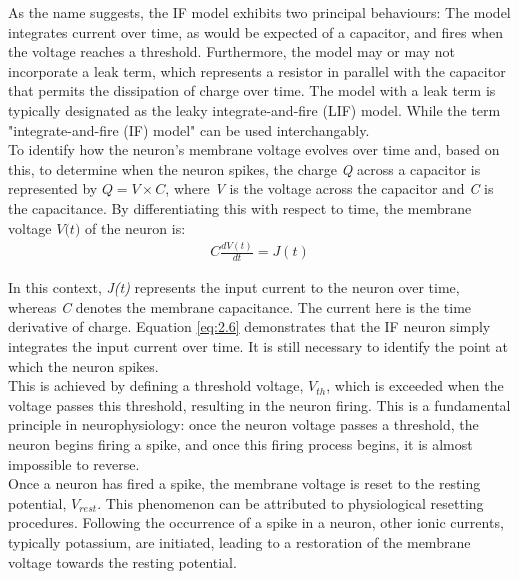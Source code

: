 \noindent As the name suggests, the IF model exhibits two principal behaviours: The model integrates current over time, as would be expected of a capacitor, and fires when the voltage reaches a threshold. Furthermore, the model may or may not incorporate a leak term, which represents a resistor in parallel with the capacitor that permits the dissipation of charge over time. The model with a leak term is typically designated as the leaky integrate-and-fire (LIF) model. While the term "integrate-and-fire (IF) model" can be used interchangably. \\

\noindent To identify how the neuron's membrane voltage evolves over time and, based on this, to determine when the neuron spikes, the charge \textit{Q} across a capacitor is represented by $Q = V \times C$, where \textit{V} is the voltage across the capacitor and \textit{C} is the capacitance. By differentiating this with respect to time, the membrane voltage $\textit{V(t)}$ of the neuron is:
\begin{align}
    C \frac{dV(t)}{dt} = J(t) \label{eq:2.6} 
\end{align}

\noindent In this context, \textit{J(t)} represents the input current to the neuron over time, whereas \textit{C} denotes the membrane capacitance. The current here is the time derivative of charge. Equation \ref{eq:2.6} demonstrates that the IF neuron simply integrates the input current over time. It is still necessary to identify the point at which the neuron spikes. \\

\noindent This is achieved by defining a threshold voltage, $V_{th}$, which is exceeded when the voltage passes this threshold, resulting in the neuron firing. This is a fundamental principle in neurophysiology: once the neuron voltage passes a threshold, the neuron begins firing a spike, and once this firing process begins, it is almost impossible to reverse. \\

\noindent Once a neuron has fired a spike, the membrane voltage is reset to the resting potential, $V_{rest}$. This phenomenon can be attributed to physiological resetting procedures. Following the occurrence of a spike in a neuron, other ionic currents, typically potassium, are initiated, leading to a restoration of the membrane voltage towards the resting potential.\\


